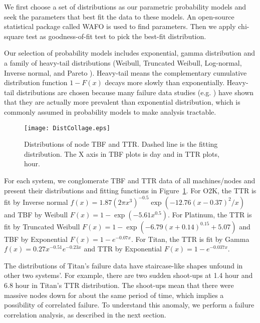 \documentclass[10pt,twocolumn]{article}
\begin{document}
We first choose a set of distributions as our parametric probability 
models and seek the parameters that best fit the data to 
these models. An open-source statistical package called WAFO 
\cite{WafoPackage} is used to find parameters. Then we apply 
chi-square test as goodness-of-fit test to pick the best-fit 
distribution.

Our selection of probability models includes exponential, gamma
distribution and a family of heavy-tail distributions (Weibull, 
Truncated Weibull, Log-normal, Inverse normal, and Pareto 
\cite{JohnsonBook}). Heavy-tail means the complementary cumulative 
distribution function  $1-F(x)$ decays more slowly than exponentially. 
Heavy-tail distributions are chosen because many failure data 
studies (e.g. \cite{Nurmi:03,Heath:01}) have shown that they are actually 
more prevalent than exponential distribution, which is 
commonly assumed in probability models to make analysis 
tractable.

\begin{figure}
   \begin{center}
   \texttt{[image: DistCollage.eps]} 
    \caption{Distributions of node TBF and TTR. Dashed line is 
    the fitting distribution.     The X axis in TBF plots is 
    day and in TTR plots, hour.}
    \label{fig:DistCollage}
   \end{center}
\end{figure}

For each system, we conglomerate TBF and TTR data of all 
machines/nodes and present their distributions and fitting 
functions in Figure~\ref{fig:DistCollage}. For O2K, the TTR is 
fit by Inverse normal 
$f(x) = 1.87(2 \pi x^3)^{-0.5} \exp(-12.76 (x-0.37)^2/x) $
and TBF by Weibull $F(x) = 1 -  \exp( -5.61 x^{0.5})$.
For Platinum, the TTR is fit by Truncated Weibull
$F(x) = 1 - \exp (- 6.79 (x+0.14)^{0.15} +5.07)$
and TBF by Exponential $F(x) = 1 - e^{-0.07x}$.
For Titan, the TTR is fit by Gamma 
$f(x) = 0.27 x^{-0.51} e^{-0.23x}$
and TTR by Exponential $F(x) = 1 - e^{-0.037x}$.

The distributions of Titan's failure data have 
staircase-like shapes unfound in other 
two systems'. For example, there are two sudden 
shoot-ups at 1.4 hour and 6.8 hour in Titan's TTR 
distribution. The shoot-ups mean that there were 
massive nodes down for about the same period of 
time, which implies a possibility of correlated 
failure. To understand this anomaly, we perform
a failure correlation analysis, as described in
the next section.
\end{document}
